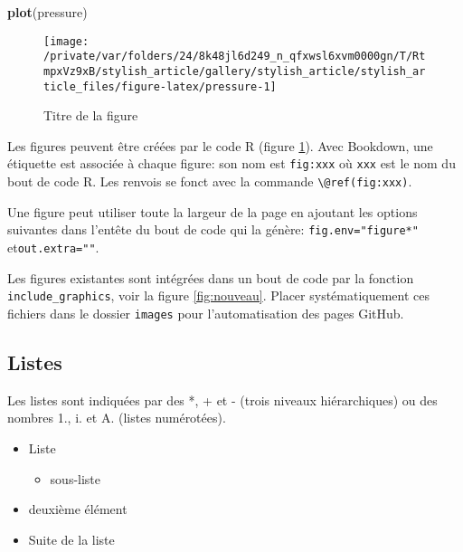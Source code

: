 \documentclass[fleqn,10pt]{latex/stylish_article} %
\providecommand{\tightlist}{%
  \setlength{\itemsep}{0pt}\setlength{\parskip}{0pt}}
\newenvironment{Shaded}{\begin{snugshade}}{\end{snugshade}}
\newcommand{\KeywordTok}[1]{\textcolor[rgb]{0.13,0.29,0.53}{\textbf{{#1}}}}
\newcommand{\NormalTok}[1]{{#1}}
\begin{document}
\scriptsize

\begin{Shaded}
\begin{Highlighting}[]
\KeywordTok{plot}\NormalTok{(pressure)}
\end{Highlighting}
\end{Shaded}

\begin{figure}

{\centering \texttt{[image: /private/var/folders/24/8k48jl6d249\_n\_qfxwsl6xvm0000gn/T/RtmpxVz9xB/stylish\_article/gallery/stylish\_article/stylish\_article\_files/figure-latex/pressure-1]} 

}

\caption{Titre de la figure}\label{fig:pressure}
\end{figure}

\normalsize

Les figures peuvent être créées par le code R (figure \ref{fig:pressure}).
Avec Bookdown, une étiquette est associée à chaque figure: son nom est \texttt{fig:xxx} où \texttt{xxx} est le nom du bout de code R.
Les renvois se fonct avec la commande \texttt{\textbackslash{}@ref(fig:xxx)}.

Une figure peut utiliser toute la largeur de la page en ajoutant les options suivantes dans l'entête du bout de code qui la génère: \texttt{fig.env="figure*"} et\break \texttt{out.extra=""}.

Les figures existantes sont intégrées dans un bout de code par la fonction \texttt{include\_graphics}, voir la figure \ref{fig:nouveau}.
Placer systématiquement ces fichiers dans le dossier \texttt{images} pour l'automatisation des pages GitHub.

\hypertarget{listes}{%
\subsection{Listes}\label{listes}}

Les listes sont indiquées par des *, + et - (trois niveaux hiérarchiques) ou des nombres 1., i. et A. (listes numérotées).

\begin{itemize}
\tightlist
\item
  Liste

  \begin{itemize}
  \tightlist
  \item
    sous-liste
  \end{itemize}
\item
  deuxième élément
\item
  Suite de la liste
\end{itemize}
\end{document}
